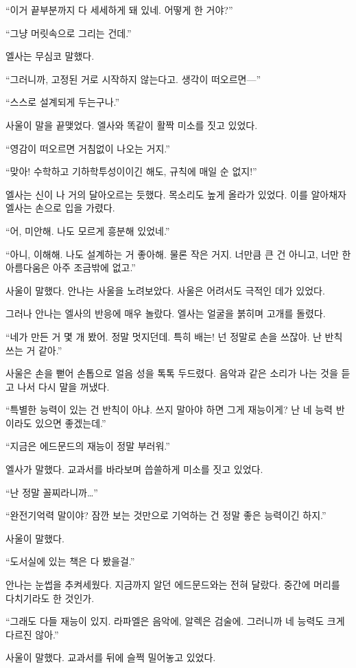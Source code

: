 ``이거 끝부분까지 다 세세하게 돼 있네. 어떻게 한 거야?''

``그냥 머릿속으로 그리는 건데.''

엘사는 무심코 말했다.

``그러니까, 고정된 거로 시작하지 않는다고. 생각이 떠오르면—''

``스스로 설계되게 두는구나.''

사울이 말을 끝맺었다. 엘사와 똑같이 활짝 미소를 짓고 있었다.

``영감이 떠오르면 거침없이 나오는 거지.''

``맞아! 수학하고 기하학투성이이긴 해도, 규칙에 매일 순 없지!''

엘사는 신이 나 거의 달아오르는 듯했다. 목소리도 높게 올라가 있었다. 이를 알아채자 엘사는 손으로 입을 가렸다.

``어, 미안해. 나도 모르게 흥분해 있었네.''

``아니, 이해해. 나도 설계하는 거 좋아해. 물론 작은 거지. 너만큼 큰 건 아니고, 너만 한 아름다움은 아주 조금밖에 없고.''

사울이 말했다. 안나는 사울을 노려보았다. 사울은 어려서도 극적인 데가 있었다.

그러나 안나는 엘사의 반응에 매우 놀랐다. 엘사는 얼굴을 붉히며 고개를 돌렸다.

``네가 만든 거 몇 개 봤어. 정말 멋지던데. 특히 배는! 넌 정말로 손을 쓰잖아. 난 반칙 쓰는 거 같아.''

사울은 손을 뻗어 손톱으로 얼음 성을 톡톡 두드렸다. 음악과 같은 소리가 나는 것을 듣고 나서 다시 말을 꺼냈다.

``특별한 능력이 있는 건 반칙이 아냐. 쓰지 말아야 하면 그게 재능이게? 난 네 능력 반이라도 있으면 좋겠는데.''

``지금은 에드문드의 재능이 정말 부러워.''

엘사가 말했다. 교과서를 바라보며 씁쓸하게 미소를 짓고 있었다.

``난 정말 꼴찌라니까\ldots''

``완전기억력 말이야? 잠깐 보는 것만으로 기억하는 건 정말 좋은 능력이긴 하지.''

사울이 말했다.

``도서실에 있는 책은 다 봤을걸.''

안나는 눈썹을 추켜세웠다. 지금까지 알던 에드문드와는 전혀 달랐다. 중간에 머리를 다치기라도 한 것인가.

``그래도 다들 재능이 있지. 라파엘은 음악에, 알렉은 검술에. 그러니까 네 능력도 크게 다르진 않아.''

사울이 말했다. 교과서를 뒤에 슬쩍 밀어놓고 있었다.

